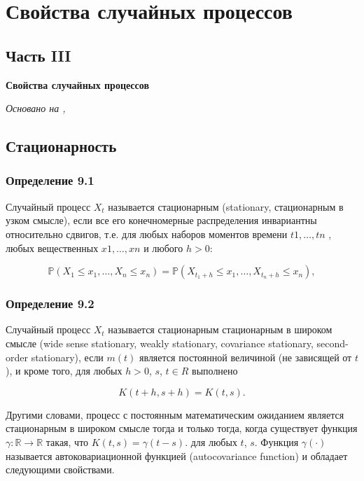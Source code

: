 \chapter{Свойства случайных процессов}
\section*{Часть III} \textbf{Свойства случайных процессов}

\textit{Основано на \cite{adeshereKorrelyaciyaMezhduVremennymi2021},
\cite{panovTeoriyaSluchaynyhProcessov2018}}

\section{Стационарность}
\subsection*{Определение 9.1} Случайный процесс \( X_t \) называется
стационарным (stationary, стационарным в узком смысле), если все его
конечномерные распределения инвариантны относительно сдвигов, т.е.
для любых наборов моментов времени $t1 , \dots, tn$ , любых вещественных
$x1 , \dots, xn$ и любого $h > 0$:

\[ \mathbb{P}(X_{1} \leq x_{1}, \ldots, X_{n} \leq x_{n}) =
\mathbb{P}(X_{t_1 + h} \leq x_{1}, \ldots, X_{t_n + h} \leq x_{n}), \]

\subsection*{Определение 9.2} Случайный процесс \( X_t \) называется
стационарным стационарным в широком смысле (wide sense stationary,
  weakly stationary, covariance stationary,
second-order stationary), если $m(t)$ является постоянной величиной
(не зависящей от $t$), и кроме того, для любых $h > 0$, $s$, $t \in R$ выполнено

\[ K(t + h, s + h) = K(t, s). \]

Другими словами, процесс с постоянным математическим ожиданием
является стационарным в широком смысле тогда и только тогда, когда
существует функция $ \gamma : \mathbb{R} \to \mathbb{R} $ такая, что $
K(t, s) = \gamma(t-s). $ для любых $t$, $s$. Функция $ \gamma
(\cdot) $ называется автоковариационной функцией
(autocovariance function)
и обладает следующими свойствами.


